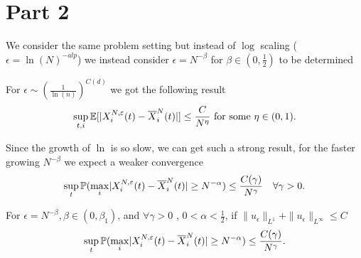 \section{Part 2}
We consider the same problem setting but instead of $\log$ scaling ($\epsilon = \ln(N)^{-alp} $) we instead consider $\epsilon = N^{-\beta } $ for $\beta  \in  (0,\frac{1}{2})$ to be determined
\begin{remark}
  For $\epsilon \sim (\frac{1}{\ln(n)})^{C(d)} $ we got the following result
 \begin{align*}
   \sup_{t,i} \mathbb{E}[\lvert X^{N,\varepsilon}_i(t) - \overline{X}^{N}_i(t)\rvert ] \le  \frac{C}{N^{\eta } } \text{ for some } \eta  \in (0,1)
 .\end{align*} 
\end{remark}
\begin{remark}
 Since the growth of $\ln $  is so slow, we can get such a strong result, for the faster growing $N^{-\beta } $ we expect a weaker convergence  
 \begin{align*}
   \sup_{t} \mathbb{P}(\max_{i} \lvert X^{N,\varepsilon}_i(t) - \overline{X}_i^{N}(t)   \rvert \ge N^{-\alpha } ) \le \frac{C(\gamma )}{N^{\gamma } } \quad \forall  \gamma  > 0
 .\end{align*}
\end{remark}
\begin{theorem}[$\epsilon = N^{-\beta}$ Convergence]
  For $\epsilon = N^{-\beta }, \beta  \in  (0,\beta_1) $, and   $\forall  \gamma  > 0$ , $0 < \alpha  < \frac{1}{2}$, if $\|u_\epsilon\|_{L^{1}} + \|u_\epsilon\|_{L^{\infty} } \le  C $ 
 \begin{align*}
   \sup_{t} \mathbb{P}(\max_{i} \lvert X^{N,\varepsilon}_i(t) - \overline{X}_i^{N}(t)   \rvert \ge N^{-\alpha } ) \le \frac{C(\gamma )}{N^{\gamma } } 
 .\end{align*}
\end{theorem}
